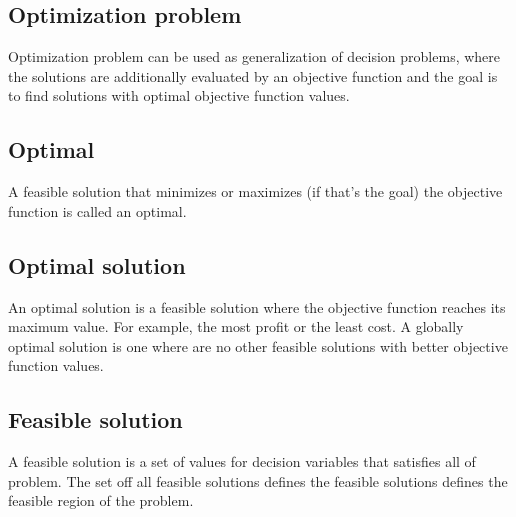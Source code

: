 \documentclass[12pt]{report}
\begin{document}
	\subsection{Optimization problem}
	Optimization problem can be used as generalization of decision problems, where the solutions are additionally evaluated by an objective function and the goal is to find solutions with optimal objective function values.\\
	
	\subsection{Optimal}
	A feasible solution that minimizes or maximizes (if that's the goal) the objective function is called an optimal.\\
	
	\subsection{Optimal solution}
	An optimal solution is a feasible solution where the objective function reaches its maximum value. For example, the most profit or the least cost. A globally optimal solution is one where are no other feasible solutions with better objective function values.\\
	
	\subsection{Feasible solution}
	A feasible solution is a set of values for decision variables that satisfies all of problem. The set off all feasible solutions defines the feasible solutions defines the feasible region of the problem.\\
	
\end{document}
